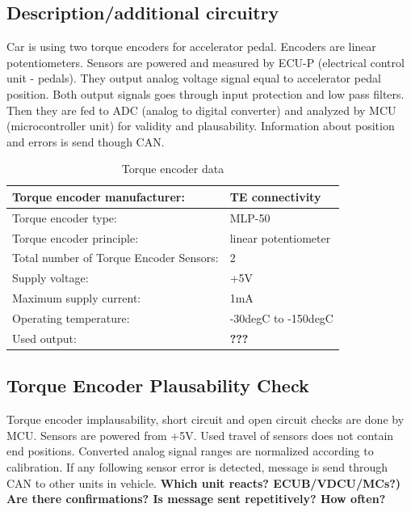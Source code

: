 \subsection{Description/additional circuitry}
Car is using two torque encoders for accelerator pedal. Encoders are linear potentiometers. Sensors are powered and measured by ECU-P (electrical control unit - pedals). They output analog voltage signal equal to accelerator pedal position. Both output signals goes through input protection and low pass filters. Then they are fed to ADC (analog to digital converter) and analyzed by MCU (microcontroller unit) for validity and plausability. Information about position and errors is send though CAN.

\begin{table}[H]
	\centering
	\caption{Torque encoder data}
	\begin{tabularx}{\textwidth}{|X|X|}
		\hline
		Torque encoder manufacturer: & TE connectivity  \\[\TableSize]\hline
		Torque encoder type: & MLP-50  \\[\TableSize]\hline
		Torque encoder principle: & linear potentiometer  \\[\TableSize]\hline
		Total number of Torque Encoder Sensors: & 2  \\[\TableSize]\hline
		Supply voltage: & +5V  \\[\TableSize]\hline
		Maximum supply current: & 1mA  \\[\TableSize]\hline
		Operating temperature: & -30degC to -150degC  \\[\TableSize]\hline
		Used output: &  \textbf{???}\\[\TableSize]\hline
	\end{tabularx}%
	\label{tab:encoder-general}%
\end{table}%

\subsection{Torque Encoder Plausability Check}
Torque encoder implausability, short circuit and open circuit checks are done by MCU. Sensors are powered from +5V. Used travel of sensors does not contain end positions. Converted analog signal ranges are normalized according to calibration.
If any following sensor error is detected, message is send through CAN to other units in vehicle. \textbf{Which unit reacts? ECUB/VDCU/MCs?) Are there confirmations? Is message sent repetitively? How often?}

